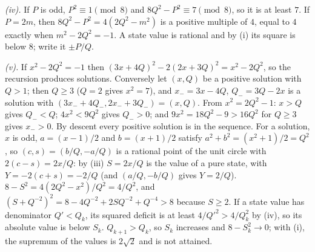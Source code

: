 \emph{(iv).} If $P$ is odd, $P^{2} \equiv 1 \pmod 8$ and $8Q^{2} - P^{2} \equiv 7 \pmod 8$, so it is at least $7$. If $P = 2m$, then $8Q^{2} - P^{2} = 4(2Q^{2} - m^{2})$ is a positive multiple of $4$, equal to $4$ exactly when $m^{2} - 2Q^{2} = -1$. A state value is rational and by (i) its square is below $8$; write it $\pm P/Q$.

\emph{(v).} If $x^{2} - 2Q^{2} = -1$ then $(3x + 4Q)^{2} - 2(2x + 3Q)^{2} = x^{2} - 2Q^{2}$, so the recursion produces solutions. Conversely let $(x, Q)$ be a positive solution with $Q > 1$; then $Q \ge 3$ ($Q = 2$ gives $x^{2} = 7$), and $x_{-} = 3x - 4Q$, $Q_{-} = 3Q - 2x$ is a solution with $(3x_{-} + 4Q_{-}, 2x_{-} + 3Q_{-}) = (x, Q)$. From $x^{2} = 2Q^{2} - 1$: $x > Q$ gives $Q_{-} < Q$; $4x^{2} < 9Q^{2}$ gives $Q_{-} > 0$; and $9x^{2} = 18Q^{2} - 9 > 16Q^{2}$ for $Q \ge 3$ gives $x_{-} > 0$. By descent every positive solution is in the sequence. For a solution, $x$ is odd, $a = (x - 1)/2$ and $b = (x + 1)/2$ satisfy $a^{2} + b^{2} = (x^{2} + 1)/2 = Q^{2}$, so $(c, s) = (b/Q, -a/Q)$ is a rational point of the unit circle with $2(c - s) = 2x/Q$: by (iii) $S = 2x/Q$ is the value of a pure state, with $Y = -2(c + s) = -2/Q$ (and $(a/Q, -b/Q)$ gives $Y = 2/Q$). $8 - S^{2} = 4(2Q^{2} - x^{2})/Q^{2} = 4/Q^{2}$, and $(S + Q^{-2})^{2} = 8 - 4Q^{-2} + 2SQ^{-2} + Q^{-4} > 8$ because $S \ge 2$. If a state value has denominator $Q' < Q_{k}$, its squared deficit is at least $4/Q'^{2} > 4/Q_{k}^{2}$ by (iv), so its absolute value is below $S_{k}$. $Q_{k+1} > Q_{k}$, so $S_{k}$ increases and $8 - S_{k}^{2} \to 0$; with (i), the supremum of the values is $2\sqrt{2}$ and is not attained.
